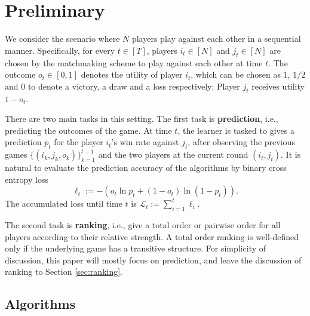 \section{Preliminary}
\label{sec:prelim}
We consider the scenario where $N$ players play against each other in a sequential manner. Specifically, for every $t\in [T]$, players $i_t\in [N]$ and $j_t\in [N]$ are chosen by the matchmaking scheme to play against each other at time $t$. The outcome $o_t\in [0,1]$ denotes the utility of player $i_t$, which can be chosen as $1$, $1/2$ and $0$ to denote a victory, a draw and a loss respectively; Player $j_t$ receives utility $1-o_t$.

There are two main tasks in this setting. The first task is \textbf{prediction}, i.e., predicting the outcomes of the game. At time $t$, the learner is tasked to gives a prediction $p_t$ for the player $i_t$'s win rate against $j_t$, after observing the previous games $\{(i_k,j_k,o_k)\}_{k=1}^{t-1}$ and the two players at the current round $(i_t,j_t)$. It is natural to evaluate the prediction accuracy of the algorithms by binary cross entropy loss
\begin{equation}
    \ell_t := -(o_t \ln p_t + (1-o_t) \ln (1-p_t)).
\end{equation}
The accumulated loss until time $t$ is $\mathcal{L}_t:= \sum_{i=1}^{t}\ell_i$.

The second task is \textbf{ranking}, i.e., give a total order or pairwise order for all players according to their relative strength. A total order ranking is well-defined only if the underlying game has a transitive structure. For simplicity of discussion, this paper will mostly focus on prediction, and leave the discussion of ranking to Section \ref{sec:ranking}.



\subsection{Algorithms}

